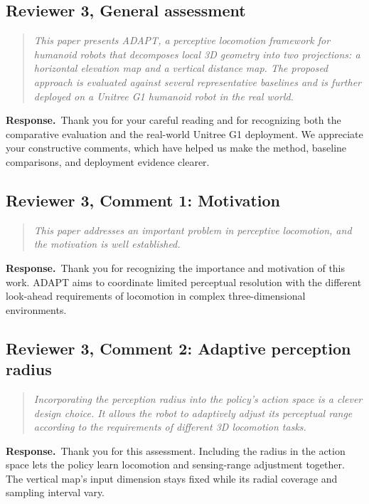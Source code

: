 \documentclass[11pt]{article}
\newenvironment{reviewcomment}{\begin{quote}\color{reviewblue}\itshape}{\end{quote}}
\newcommand{\Response}{\par\noindent\textbf{Response.}\ }
\begin{document}
\subsection*{Reviewer 3, General assessment}
\begin{reviewcomment}
This paper presents ADAPT, a perceptive locomotion framework for humanoid robots that decomposes local 3D geometry into two projections: a horizontal elevation map and a vertical distance map. The proposed approach is evaluated against several representative baselines and is further deployed on a Unitree G1 humanoid robot in the real world.
\end{reviewcomment}
\Response Thank you for your careful reading and for recognizing both the comparative evaluation and the real-world Unitree G1 deployment. We appreciate your constructive comments, which have helped us make the method, baseline comparisons, and deployment evidence clearer.

\subsection*{Reviewer 3, Comment 1: Motivation}
\begin{reviewcomment}
This paper addresses an important problem in perceptive locomotion, and the motivation is well established.
\end{reviewcomment}
\Response Thank you for recognizing the importance and motivation of this work. ADAPT aims to coordinate limited perceptual resolution with the different look-ahead requirements of locomotion in complex three-dimensional environments.


\subsection*{Reviewer 3, Comment 2: Adaptive perception radius}
\begin{reviewcomment}
Incorporating the perception radius into the policy's action space is a clever design choice. It allows the robot to adaptively adjust its perceptual range according to the requirements of different 3D locomotion tasks.
\end{reviewcomment}
\Response Thank you for this assessment. Including the radius in the action space lets the policy learn locomotion and sensing-range adjustment together. The vertical map's input dimension stays fixed while its radial coverage and sampling interval vary.
\end{document}
